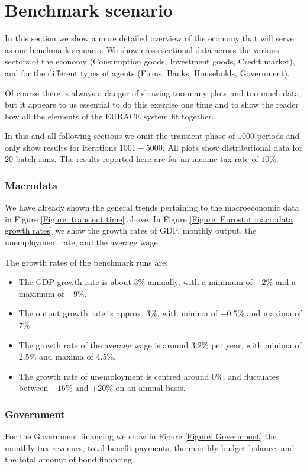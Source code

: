 \section{Benchmark scenario}
In this section we show a more detailed overview of the economy that will serve as our benchmark scenario.
We show cross sectional data across the various sectors of the economy (Consumption goods, Investment goods, Credit market),
and for the different types of agents (Firms, Banks, Households, Government). 

Of course there is always a danger of showing too many plots and too much data,
but it appears to us essential to do this exercise one time and to show the reader how
all the elements of the EURACE system fit together.

In this and all following sections we omit the transient phase of $1000$ periods and only show results for iterations $1001-5000$.
All plots show distributional data for $20$ batch runs. The results reported here are for an income tax rate of $10\%$.

\subsubsection*{Macrodata}
We have already shown the general trends pertaining to the macroeconomic data in Figure \ref{Figure: transient time} above. 
In Figure \ref{Figure: Eurostat macrodata growth rates} we show the growth rates of GDP, monthly output, the unemployment rate, and the average wage.

The growth rates of the benchmark runs are:
\begin{itemize}
\item The GDP growth rate is about $3\%$ annually, with a minimum of $-2\%$ and a maximum of $+9\%$.
\item The output growth rate is approx. $3\%$, with minima of $-0.5\%$ and maxima of $7\%$.
\item The growth rate of the average wage is around $3.2\%$ per year, with minima of $2.5\%$ and maxima of $4.5\%$.
\item The growth rate of unemployment is centred around $0\%$, and fluctuates between $-16\%$ and $+20\%$ on an annual basis.
\end{itemize}

\subsubsection*{Government}
For the Government financing we show in Figure \ref{Figure: Government} the monthly tax revenues, total benefit payments, the monthly budget balance,
and the total amount of bond financing.

